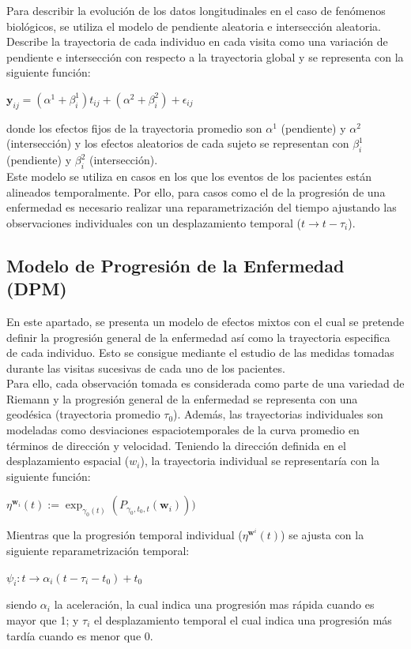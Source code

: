 \documentclass[12pt]{article}
\begin{document}
Para describir la evolución de los datos longitudinales en el caso de fenómenos biológicos, se utiliza el modelo de pendiente aleatoria e intersección aleatoria. Describe la trayectoria de cada individuo en cada visita como una variación de pendiente e intersección con respecto a la trayectoria global y se representa con la siguiente función:
\begin{center}
	$\textbf{y}_{ij}=(\alpha^{1}+\beta_{i}^{1})t_{ij}+(\alpha^{2}+\beta_{i}^{2})+\epsilon_{ij}$
\end{center}
donde los efectos fijos de la trayectoria promedio son $\alpha^{1}$ (pendiente) y $\alpha^{2}$ (intersección) y los efectos aleatorios de cada sujeto se representan con $\beta_{i}^{1}$ (pendiente) y $\beta_{i}^{2}$ (intersección).\\

Este modelo se utiliza en casos en los que los eventos de los pacientes están alineados temporalmente. Por ello, para casos como el de la progresión de una enfermedad es necesario realizar una reparametrización del tiempo ajustando las observaciones individuales con un desplazamiento temporal ($t \rightarrow t-\tau_{i}$).

\subsection{Modelo de Progresión de la Enfermedad (DPM)}
En este apartado, se presenta un modelo de efectos mixtos con el cual se pretende definir la progresión general de la enfermedad así como la trayectoria especifica de cada individuo. Esto se consigue mediante el estudio de las medidas tomadas durante las visitas sucesivas de cada uno de los pacientes.\\

Para ello, cada observación tomada es considerada como parte de una variedad de Riemann y la progresión general de la enfermedad se representa con una geodésica (trayectoria promedio $\tau_{0}$). Además, las trayectorias individuales son modeladas como desviaciones espaciotemporales de la curva promedio en términos de dirección y velocidad. Teniendo la dirección definida en el desplazamiento espacial ($w_{i}$), la trayectoria individual se representaría con la siguiente función:
\begin{center}
	$\eta^{\textbf{w}_{i}}(t):=\exp_{\gamma_0(t)} (P_{\gamma_0,t_0,t}(\textbf{w}_i)))$
\end{center}
Mientras que la progresión temporal individual ($\eta^{\textbf{w}^{i}}(t)$) se ajusta con la siguiente reparametrización temporal:
\begin{center}
	$\psi_i:t \rightarrow \alpha_i(t - \tau_i - t_0) + t_0$
\end{center}
siendo $\alpha_i$ la aceleración, la cual indica una progresión mas rápida cuando es mayor que 1; y $\tau_{i}$ el desplazamiento temporal el cual indica una progresión más tardía cuando es menor que 0.\\
\end{document}
